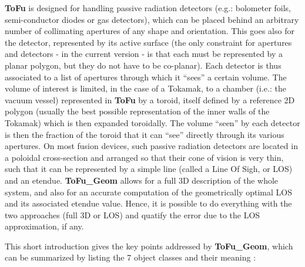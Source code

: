 \documentclass[letterpaper,10pt,english]{sphinxmanual}
\begin{document}
\textbf{ToFu} is designed for handling passive radiation detectors (e.g.: bolometer foils, semi-conductor diodes or gas detectors), which can be placed behind an arbitrary number of collimating apertures of any shape and orientation. This goes also for the detector, represented by its active surface (the only constraint for apertures and detectors - in the current version - is that each must be represented by a planar polygon, but they do not have to be co-planar). Each detector is thus associated to a list of apertures through which it ``sees'' a certain volume. The volume of interest is limited, in the case of a Tokamak, to a chamber (i.e.: the vacuum vessel) represented in \textbf{ToFu} by a toroid, itself defined by a reference 2D polygon (usually the best possible representation of the inner walls of the Tokamak) which is then expanded toroidally. The volume ``seen'' by each detector is then the fraction of the toroid that it can ``see'' directly through its various apertures. On most fusion devices, such passive radiation detectors are located in a poloidal cross-section and arranged so that their cone of vision is very thin, such that it can be represented by a simple line (called a Line Of Sigh, or LOS) and an etendue. \textbf{ToFu\_Geom} allows for a full 3D description of the whole system, and also for an accurate computation of the geometrically optimal LOS and its associated etendue value. Hence, it is possible to do everything with the two approaches (full 3D or LOS) and quatify the error due to the LOS approximation, if any.

This short introduction gives the key points addressed by \textbf{ToFu\_Geom}, which can be summarized by listing the 7 object classes and their meaning :
\end{document}
